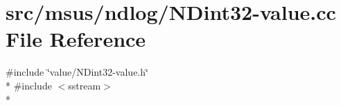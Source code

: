 \hypertarget{_n_dint32-value_8cc}{\section{src/msus/ndlog/\-N\-Dint32-\/value.cc File Reference}
\label{_n_dint32-value_8cc}
}
{\ttfamily \#include \char`\"{}value/\-N\-Dint32-\/value.\-h\char`\"{}}\\*
{\ttfamily \#include $<$sstream$>$}\\*
